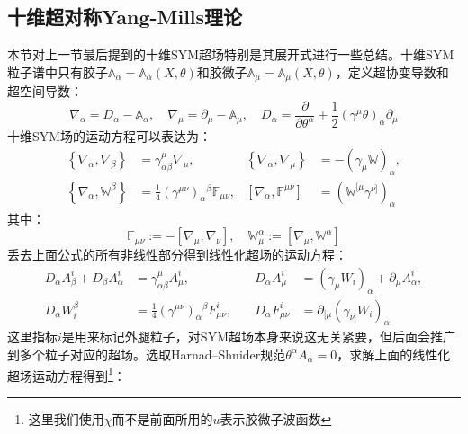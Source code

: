 \subsection{十维超对称Yang-Mills理论}
本节对上一节最后提到的十维SYM超场特别是其展开式进行一些总结。十维SYM粒子谱中只有胶子$\mathbb{A}_\alpha=\mathbb{A}_\alpha(X,\theta)$和胶微子$\mathbb{A}_\mu=\mathbb{A}_\mu(X,\theta)$，定义超协变导数和超空间导数：
\begin{equation}
	\nabla_\alpha = D_\alpha - \mathbb{A}_\alpha, \quad
	\nabla_\mu = \partial_\mu - \mathbb{A}_\mu, \quad
	D_\alpha = \frac{\partial}{\partial\theta^\alpha} + \frac{1}{2} (\gamma^\mu \theta)_\alpha \partial_\mu
\end{equation}
十维SYM场的运动方程可以表达为：
\begin{equation}
	\begin{aligned}
		\left\{\nabla_\alpha, \nabla_\beta\right\} 
		&= \gamma_{\alpha\beta}^\mu \nabla_\mu, \quad 
		& \left\{\nabla_\alpha, \nabla_\mu\right\} 
		&= -(\gamma_\mu \mathbb{W})_\alpha, \\
		\left\{\nabla_\alpha, \mathbb{W}^\beta\right\} 
		&= \frac{1}{4} (\gamma^{\mu\nu})_\alpha{}^\beta \mathbb{F}_{\mu\nu}, 
		& \left[\nabla_\alpha, \mathbb{F}^{\mu\nu}\right] 
		&= (\mathbb{W}^{[\mu} \gamma^{\nu]})_\alpha
	\end{aligned}
\end{equation}
其中：
\begin{equation}
		\mathbb{F}_{\mu\nu} := -\left[\nabla_\mu, \nabla_\nu\right], \quad \mathbb{W}_\mu^\alpha := \left[\nabla_\mu, \mathbb{W}^\alpha\right]
\end{equation}
丢去上面公式的所有非线性部分得到线性化超场的运动方程：
\begin{equation}
\begin{aligned}
	D_\alpha A_\beta^i + D_\beta A_\alpha^i 
	&= \gamma_{\alpha\beta}^\mu A_\mu^i, \quad 
	& D_\alpha A_\mu^i 
	&= (\gamma_\mu W_i)_\alpha + \partial_\mu A_\alpha^i, \\
	D_\alpha W_i^\beta 
	&= \frac{1}{4} (\gamma^{\mu\nu})_\alpha{}^\beta F_{\mu\nu}^i, \quad 
	& D_\alpha F_{\mu\nu}^i 
	&= \partial_{[\mu} (\gamma_{\nu]} W_i)_\alpha
\end{aligned}
\end{equation}
这里指标$i$是用来标记外腿粒子，对SYM超场本身来说这无关紧要，但后面会推广到多个粒子对应的超场。选取Harnad–Shnider规范$\theta^\alpha A_{\alpha} = 0$，求解上面的线性化超场运动方程得到\footnote{这里我们使用$\chi$而不是前面所用的$u$表示胶微子波函数}：\cite{Policastro:2006vt}
